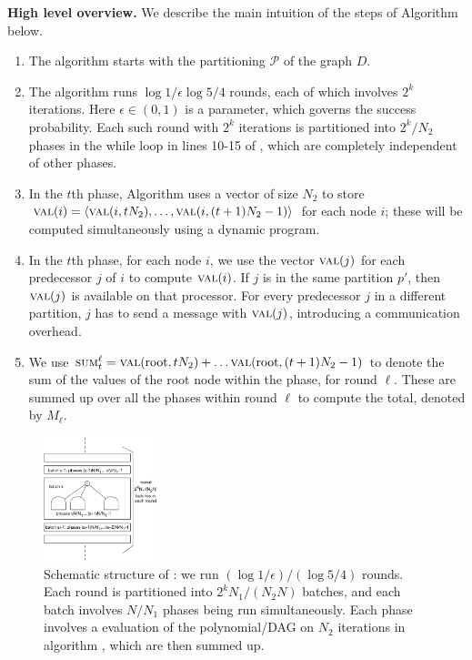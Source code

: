\noindent
\textbf{High level overview.}
We describe the main intuition of the steps of Algorithm \parmaxwt{} below.
\begin{enumerate}
\item
The algorithm starts with the partitioning $\mathcal{P}$ of the graph $D$.
\item
The algorithm runs $\log{1/\epsilon}\log{5/4}$ rounds, each of which involves $2^k$ iterations.
Here $\epsilon\in(0, 1)$ is a parameter, which governs the success probability.
Each such round with $2^k$ iterations is partitioned into
$2^k/N_2$ phases in the while loop in lines 10-15 of \maxwt{}, which
are completely independent of other phases.
\item
In the $t$th phase, Algorithm \parcircuit{} uses a vector of size $N_2$ to store
$\textsc{val}(i) = \langle \textsc{val}(i, tN_2),\ldots, \textsc{val}(i, (t+1)N_2-1)\rangle$ for each node $i$; these
will be computed simultaneously using a dynamic program.
\item
In the $t$th phase, for each node $i$, we use the vector
$\textsc{val}(j)$ for each predecessor $j$ of $i$ to compute $\textsc{val}(i)$.
If $j$ is in the same partition $p'$, then $\textsc{val}(j)$ is available on that processor.
For every predecessor $j$ in a different partition, 
$j$ has to send a message with $\textsc{val}(j)$, introducing a communication overhead.
\item
We use $\textsc{sum}^{\ell}_t = \textsc{val}(\text{root}, tN_2) + \ldots \textsc{val}(\text{root}, (t+1)N_2-1)$ 
to denote the sum of the values of the root node within the phase, for round $\ell$. These are summed up
over all the phases within round $\ell$ to compute the total, denoted by $M_{\ell}$.
\end{enumerate}

\begin{figure}[h]
\centering
\includegraphics[width=0.3\textwidth]{img/parallel.pdf}
\caption{
\small
Schematic structure of \parmaxwt{}: we run $(\log{1/\epsilon})/(\log{5/4})$ rounds.
Each round is partitioned into $2^kN_1/(N_2N)$ batches, and each batch involves
$N/N_1$ phases being run simultaneously. Each phase involves a evaluation of the
polynomial/DAG on $N_2$ iterations in algorithm \parcircuit{}, which are then summed up.
}
\label{fig:parallel}
\end{figure}

